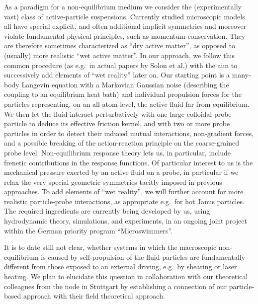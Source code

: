 \begin{workpackage}[id=WPactive,wphases=0-48,
  short=Active Particle Suspensions,%
  title=Probing Active Particle Suspensions with Colloids and Polymers,
  lead=Leipzig,
  LeipzigRM=12]
\begin{tasklist}

\begin{task}[title=Non-Equilibrium Equations of State (NEOS),id=task1,PM=15,lead=Leipzig,wphases=0-30!0.5]
As a paradigm for a non-equilibrium medium we consider the (experimentally vast) class of
active-particle suspensions.
%
Currently studied microscopic models all have special explicit, and often additional
implicit symmetries and moreover violate fundamental physical principles, such as momentum
conservation.
%
They are therefore sometimes characterized as ``dry active matter'', as opposed to (usually)
more realistic ``wet active matter''.  In our approach, we follow this common procedure (as
e.g.\ in actual papers by Solon et al.) with the aim to successively add elements of ``wet
reality'' later on.
%
Our starting point is a many-body Langevin equation with a Markovian Gaussian noise
(describing the coupling to an equilibrium heat bath) and individual propulsion forces for
the particles representing, on an all-atom-level, the active fluid far from equilibrium.
%
We then let the fluid interact perturbatively with one large colloidal probe particle to
deduce its effective friction kernel, and with two or more probe particles in order to
detect their induced mutual interactions, non-gradient forces, and a possible breaking of
the action-reaction principle on the coarse-grained probe level.  Non-equilibrium response
theory lets us, in particular, include frenetic contributions in the response functions.
%
Of particular interest to us is the mechanical pressure exerted by an active fluid on a
probe, in particular if we relax the very special geometric symmetries tacitly imposed in
previous approaches.
%
To add elements of ``wet reality'', we will further account for more realistic
particle-probe interactions, as appropriate e.g.\ for hot Janus particles.
%
The required ingredients are currently being developed by us, using hydrodynamic theory,
simulations, and experiments, in an ongoing joint project within the German priority program
``Microswimmers''.

It is to date still not clear, whether systems in which the macroscopic non-equilibrium is
caused by self-propulsion of the fluid particles are fundamentally different from those
exposed to an external driving, e.g.\ by shearing or laser heating.
%
We plan to elucidate this question in collaboration with our theoretical colleagues from the
node in Stuttgart by establishing a connection of our particle-based approach with their
field theoretical approach.


\end{task}
\end{tasklist}
\end{workpackage}
